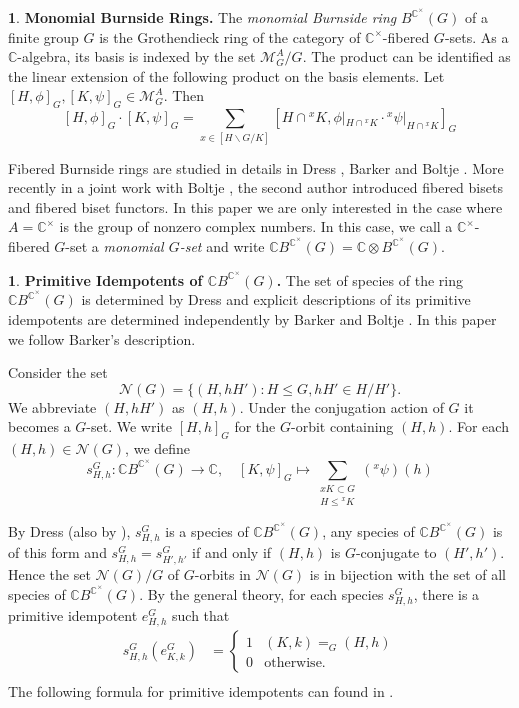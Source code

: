 \documentclass[12pt]{article}
\theoremstyle{plain}
\theoremstyle{definition}
\newtheorem{nothing}[theorem]{}
\newcommand{\MonG}{\mathbb C B^{\mathbb C^\times}(G)}
\begin{document}
\begin{nothing}{\bf Monomial Burnside Rings.}
The \emph{monomial Burnside ring} \( B^{\mathbb{C}^\times}(G) \) of a finite group \( G \) is the Grothendieck ring of the category of \( \mathbb{C}^\times \)-fibered \( G \)-sets. As a \( \mathbb{C} \)-algebra, its basis is indexed by the set $\mathcal M^A_G/G$. The product can be identified as the linear extension of the following product on the basis elements. Let $[H, \phi]_G, [K, \psi]_G\in \mathcal M_G^A$. Then 
\[ 
[H,\phi]_G\cdot [K, \psi]_G = \sum_{x\in [H\backslash G/K]}[H\cap {}^xK, \phi|_{H\cap {}^xK}\cdot {}^x\psi|_{H\cap {}^xK}]_G 
\]

Fibered Burnside rings are studied in details in Dress \cite{Dress}, Barker \cite{Bar} and Boltje \cite{Bo8}. More recently in a joint work with Boltje \cite{BoCo}, the second author introduced fibered bisets and fibered biset functors. In this paper we are only interested in the case where $A = \mathbb C^\times$ is the group of nonzero complex numbers. In this case, we call a $\mathbb C^\times$-fibered $G$-set a \textit{monomial $G$-set} and write $\MonG = \mathbb C\otimes B^{\mathbb C^\times}(G)$. 
\end{nothing}

\begin{nothing} \textbf{Primitive Idempotents of $\MonG$.} 
The set of species of the ring $\MonG$ is determined by Dress \cite{Dress} and explicit descriptions of its primitive idempotents are determined independently by Barker \cite{Bar} and Boltje \cite{Bo8}. In this paper we follow Barker's description. 

Consider the set \[ \mathcal N(G) =\{ (H, hH')\colon H\le G, hH'\in H/H' \}. \]
We abbreviate $(H, hH')$ as $(H, h)$. Under the conjugation action of $G$ it becomes a $G$-set. We write $[H, h]_G$ for the $G$-orbit containing $(H, h)$. For each $(H, h)\in \mathcal N(G)$, we define
\[s_{H, h}^G: \MonG\to \mathbb C,\quad [K, \psi]_G\mapsto \sum_{\substack{xK\subset G\\ H\le {}^xK}}({}^x\psi)(h)\]

By Dress \cite{Dress} (also by \cite[Lemma 5.1]{Bar}), $s_{H, h}^G$ is a species of $\MonG$, any species of $\MonG$ is of this form and $s_{H, h}^G = s_{H', h'}^G$ if and only if $(H, h)$ is $G$-conjugate to $(H', h')$. Hence the set $\mathcal N(G)/G$ of $G$-orbits in $\mathcal N(G)$ is in bijection with the set of all species of $\MonG$. By the general theory, for each species $s_{H, h}^G$, there is a primitive idempotent $e_{H, h}^G$ such that 
\begin{align*}
 s_{H, h}^G(e_{K, k}^G) &= \begin{cases}
  1  &  (K, k) =_G (H, h) \\
   0 & \text{otherwise.}
  \end{cases} \\
\end{align*}
The following formula for primitive idempotents can found in \cite[Theorem 5.2]{Bar}.
\end{nothing}
\end{document}
